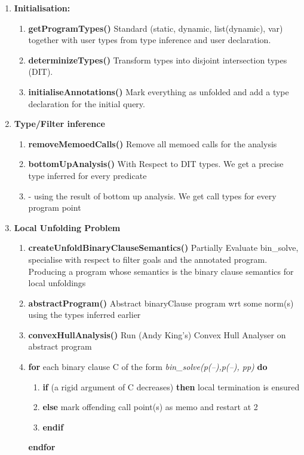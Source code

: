 \documentclass[12pt,twoside]{article}
\begin{document}
\begin{enumerate}
\item {\bf Initialisation:}
  \begin{enumerate}
  \item {\bf getProgramTypes()} Standard (static, dynamic, list(dynamic), var) together
with user types from type inference and user declaration.
  \item {\bf determinizeTypes()} Transform types into disjoint intersection types (DIT).
  \item {\bf initialiseAnnotations()} Mark everything as unfolded and add a type declaration 
for the initial query.
  \end{enumerate}

\item {\bf Type/Filter inference}
  \begin{enumerate}
  \item {\bf removeMemoedCalls()} Remove all memoed calls for the analysis
  \item {\bf bottomUpAnalysis()} With Respect to DIT types.  We get a precise type inferred for every predicate
    \item \begin{algorithmic}    
      
       - using the result of bottom up analysis.  We get call types for every program point
      \ENDFOR
      \end{algorithmic}
  \end{enumerate}
    
\item {\bf Local Unfolding Problem}
  \begin{enumerate}
  \item {\bf createUnfoldBinaryClauseSemantics()} Partially Evaluate bin\_solve, specialise with respect to filter goals and the annotated program.  Producing a program whose semantics is the binary clause semantics for local unfoldings
  \item {\bf abstractProgram()} Abstract binaryClause program wrt some norm(s) using the types inferred earlier
  \item {\bf convexHullAnalysis()} Run (Andy King's) Convex Hull Analyser on abstract program
    \item {\bf for} each binary clause C of the form {\it bin\_solve(p(--),p(--), pp)} {\bf do }
      \begin{enumerate}
        \item[]{\bf if} (a rigid argument of C decreases) {\bf then} local termination is ensured
        \item[]{\bf else} mark offending call point(s) as memo and restart at 2
        \item[]{\bf endif}        
      \end{enumerate}
      {\bf endfor}
     

\end{enumerate}
\end{enumerate}
\end{document}
